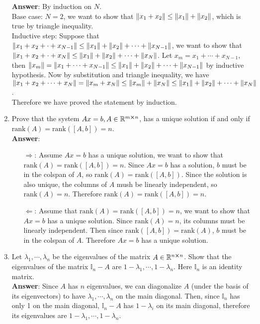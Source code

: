 \documentclass{article}
\begin{document}
\begin{enumerate}
              \textbf{Answer}: By induction on $N$.\\Base case: $N=2$, we want to show that $\norm{x_1+x_2}\leq\norm{x_1}+\norm{x_2}$, which is true by triangle inequality.\\Inductive step: Suppose that $\norm{x_1+x_2+\cdot+x_{N-1}}\leq\norm{x_1}+\norm{x_2}+\cdots+\norm{x_{N-1}}$, we want to show that $\norm{x_1+x_2+\cdot+x_N}\leq\norm{x_1}+\norm{x_2}+\cdots+\norm{x_N}$. Let $x_m=x_1+\cdots+x_{N-1}$, then $\norm{x_m}=\norm{x_1+\cdots+x_{N-1}}\leq\norm{x_1}+\norm{x_2}+\cdots+\norm{x_{N-1}}$ by inductive hypothesis. Now by substitution and triangle inequality, we have $\norm{x_1+x_2+\cdots+x_N}=\norm{x_m+x_N}\leq\norm{x_m}+\norm{x_N}\leq\norm{x_1}+\norm{x_2}+\cdots+\norm{x_N}$.\\Therefore we have proved the statement by induction.
    \item Prove that the system $Ax=b,A\in\mathbb{R}^{m\cross n}$, has a unique solution if and only if $\text{rank}(A)=\text{rank}([A,b])=n$.\\
          \textbf{Answer}:
          \begin{itemize}
              \item [$\Rightarrow$:] Assume $Ax=b$ has a unique solution, we want to show that $\text{rank}(A)=\text{rank}([A,b])=n$. Since $Ax=b$ has a solution, $b$ must be in the colspan of $A$, so $\text{rank}(A)=\text{rank}([A,b])$. Since the solution is also unique, the columns of $A$ mush be linearly independent, so $\text{rank}(A)=n$. Therefore $\text{rank}(A)=\text{rank}([A,b])=n$.
              \item [$\Leftarrow$:] Assume that $\text{rank}(A)=\text{rank}([A,b])=n$, we want to show that $Ax=b$ has a unique solution. Since $\text{rank}(A)=n$, its columns must be linearly independent. Then since $\text{rank}([A,b])=\text{rank}(A)$, $b$ must be in the colspan of $A$. Therefore $Ax=b$ has a unique solution.
          \end{itemize}
    \item Let $\lambda_1,\cdots,\lambda_n$ be the eigenvalues of the matrix $A\in\mathbb{R}^{n\cross n}$. Show that the eigenvalues of the matrix $\mathbb{I}_n-A$ are $1-\lambda_1,\cdots,1-\lambda_n$. Here $\mathbb{I}_n$ is an identity matrix.\\
          \textbf{Answer}: Since $A$ has $n$ eigenvalues, we can diagonalize $A$ (under the basis of its eigenvectors) to have $\lambda_1,\cdots,\lambda_n$ on the main diagonal. Then, since $\mathbb{I}_n$ has only 1 on the main diagonal, $\mathbb{I}_n-A$ has $1-\lambda_i$ on its main diagonal, therefore its eigenvalues are $1-\lambda_1,\cdots,1-\lambda_n$.

\end{enumerate}
\end{document}
